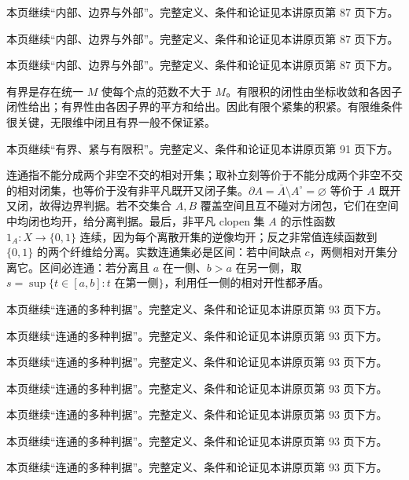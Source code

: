 本页继续“内部、边界与外部”。完整定义、条件和论证见本讲原页第 87 页下方。

本页继续“内部、边界与外部”。完整定义、条件和论证见本讲原页第 87 页下方。

本页继续“内部、边界与外部”。完整定义、条件和论证见本讲原页第 87 页下方。

有界是存在统一 $M$ 使每个点的范数不大于 $M$。有限积的闭性由坐标收敛和各因子闭性给出；有界性由各因子界的平方和给出。因此有限个紧集的积紧。有限维条件很关键，无限维中闭且有界一般不保证紧。

本页继续“有界、紧与有限积”。完整定义、条件和论证见本讲原页第 91 页下方。

连通指不能分成两个非空不交的相对开集；取补立刻等价于不能分成两个非空不交的相对闭集，也等价于没有非平凡既开又闭子集。$\partial A=\overline A\setminus A^\circ=\varnothing$ 等价于 $A$ 既开又闭，故得边界判据。若不交集合 $A,B$ 覆盖空间且互不碰对方闭包，它们在空间中均闭也均开，给分离判据。最后，非平凡 clopen 集 $A$ 的示性函数 $1_A:X\to\{0,1\}$ 连续，因为每个离散开集的逆像均开；反之非常值连续函数到 $\{0,1\}$ 的两个纤维给分离。实数连通集必是区间：若中间缺点 $c$，两侧相对开集分离它。区间必连通：若分离且 $a$ 在一侧、$b>a$ 在另一侧，取 $s=\sup\{t\in[a,b]:t\text{ 在第一侧}\}$，利用任一侧的相对开性都矛盾。

本页继续“连通的多种判据”。完整定义、条件和论证见本讲原页第 93 页下方。

本页继续“连通的多种判据”。完整定义、条件和论证见本讲原页第 93 页下方。

本页继续“连通的多种判据”。完整定义、条件和论证见本讲原页第 93 页下方。

本页继续“连通的多种判据”。完整定义、条件和论证见本讲原页第 93 页下方。

本页继续“连通的多种判据”。完整定义、条件和论证见本讲原页第 93 页下方。

本页继续“连通的多种判据”。完整定义、条件和论证见本讲原页第 93 页下方。

本页继续“连通的多种判据”。完整定义、条件和论证见本讲原页第 93 页下方。
